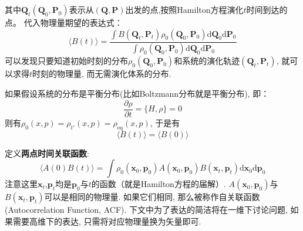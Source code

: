     其中$\bm{Q}_t(\bm{Q}_0, \bm{P}_0)$表示从$(\bm{Q}, \bm{P})$出发的点,按照Hamilton方程演化$t$时间到达的点。
    代入物理量期望的表达式：
    \begin{equation}
        \langle B(t) \rangle = \frac {\int B(\bm{Q}_t,\bm{P}_t) \rho_0(\bm{Q}_0,\bm{P}_0) \mathrm{d}\bm{Q}_0\mathrm{d}\bm{P}_0}{\int \rho_0(\bm{Q}_0,\bm{P}_0) \mathrm{d}\bm{Q}_0\mathrm{d}\bm{P}_0}
    \end{equation}
    可以发现只要知道初始时刻的分布$\rho_0(\bm{Q}_0,\bm{P}_0)$和系统的演化轨迹$(\bm{Q}_t,\bm{P}_t)$, 就可以求得$t$时刻的物理量, 而无需演化体系的分布. 

    如果假设系统的分布是平衡分布(比如Boltzmann分布就是平衡分布), 即：
    \begin{equation}
        \frac {\partial \rho}{\partial t} = \{ H, \rho\} = 0
    \end{equation}
    则有$\rho_0(x,p) = \rho_{t'}(x, p) = \rho_{\mathrm{eq}}(x, p)$, 于是有
    \begin{equation}
        \langle B(t) \rangle = \langle B(0) \rangle
    \end{equation}

    \splitline

    定义\textbf{两点时间关联函数}:
    \begin{equation}
        \langle A(0)B(t) \rangle = \int \rho_0(\bm{x}_0,\bm{p}_0) A(\bm{x}_0,\bm{p}_0) B(\bm{x}_t,\bm{p}_t) \mathrm{d}\bm{x}_0 \mathrm{d}\bm{p}_0
    \end{equation}
    注意这里$\bm{x}_t$,$\bm{p}_t$均是$\bm{p}_0$与$t$的函数（就是Hamilton方程的届解）.
     $A(\bm{x}_0,\bm{p}_0)$与$B(\bm{x}_t,\bm{p}_t)$可以是相同的物理量. 如果它们相同, 
     那么被称作自关联函数(Autocorrelation Function, ACF). 
     下文中为了表达的简洁将在一维下讨论问题, 如果需要高维下的表达, 只需将对应物理量换为矢量即可.

